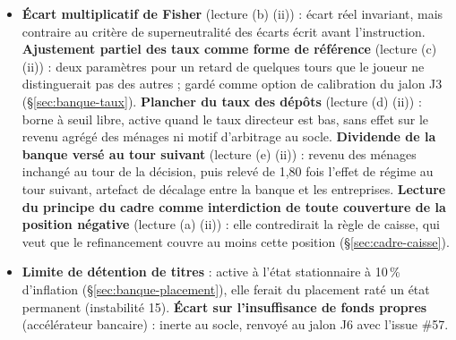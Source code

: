 \documentclass[11pt,a4paper]{article}
\begin{document}
\begin{itemize}
\item \textbf{Écart multiplicatif de Fisher} (lecture (b) (ii)) : écart réel invariant, mais contraire au critère de superneutralité des écarts écrit avant l'instruction. \textbf{Ajustement partiel des taux comme forme de référence} (lecture (c) (ii)) : deux paramètres pour un retard de quelques tours que le joueur ne distinguerait pas des autres ; gardé comme option de calibration du jalon J3 (\S\ref{sec:banque-taux}). \textbf{Plancher du taux des dépôts} (lecture (d) (ii)) : borne à seuil libre, active quand le taux directeur est bas, sans effet sur le revenu agrégé des ménages ni motif d'arbitrage au socle. \textbf{Dividende de la banque versé au tour suivant} (lecture (e) (ii)) : revenu des ménages inchangé au tour de la décision, puis relevé de 1,80 fois l'effet de régime au tour suivant, artefact de décalage entre la banque et les entreprises. \textbf{Lecture du principe du cadre comme interdiction de toute couverture de la position négative} (lecture (a) (ii)) : elle contredirait la règle de caisse, qui veut que le refinancement couvre au moins cette position (\S\ref{sec:cadre-caisse}).
\item \textbf{Limite de détention de titres} : active à l'état stationnaire à 10\,\% d'inflation (\S\ref{sec:banque-placement}), elle ferait du placement raté un état permanent (instabilité 15). \textbf{Écart sur l'insuffisance de fonds propres} (accélérateur bancaire) : inerte au socle, renvoyé au jalon J6 avec l'issue \#57.
\end{itemize}
\end{document}
